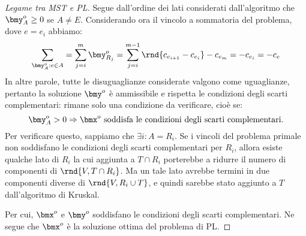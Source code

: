 \documentclass[\main/main.tex]{subfiles}
\begin{document}
\begin{proof}[Legame tra MST e PL]
  Segue dall'ordine dei lati considerati dall'algoritmo che \(\bmy^o_A \geq 0\) se \(A\neq E\). Considerando ora il vincolo a sommatoria del problema, dove \(e=e_i\) abbiamo:
  \[
    \sum_{\bmy^o_A: e \in A} = \sum_{j=i}^m \bmy^o_{R_j} = \sum_{j=i}^{m-1}\rnd{c_{e_{i+1}}-c_{e_i}} - c_{e_m} = -c_{e_i} = -c_e
  \]
  In altre parole, tutte le disuguaglianze considerate valgono come uguaglianze, pertanto la soluzione \(\bmy^o\) è ammissibile e rispetta le condizioni degli scarti complementari: rimane solo una condizione da verificare, cioè se:
  \[
    \bmy^o_A > 0 \Rightarrow \bmx^o \text{ soddisfa le condizioni degli scarti complementari.}
  \]
  Per verificare questo, sappiamo che \(\exists i: A = R_i\). Se i vincoli del problema primale non soddisfano le condizioni degli scarti complementari per \(R_i\), allora esiste qualche lato di \(R_i\) la cui aggiunta a \(T\cap R_i\) porterebbe a ridurre il numero di componenti di \(\rnd{V, T \cap R_i}\). Ma un tale lato avrebbe termini in due componenti diverse di \(\rnd{V, R_i \cup T}\), e quindi sarebbe stato aggiunto a \(T\) dall'algoritmo di Kruskal.

  Per cui, \(\bmx^o\) e \(\bmy^o\) soddisfano le condizioni degli scarti complementari. Ne segue che \(\bmx^o\) è la soluzione ottima del problema di PL.
\end{proof}
\end{document}
